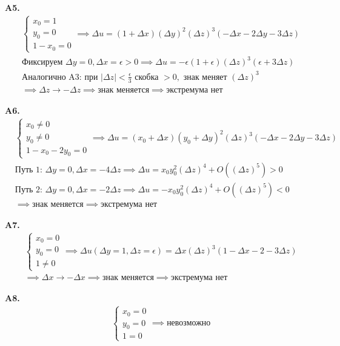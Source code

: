 \documentclass[12pt]{article}
\begin{document}
\noindent \textbf{A5.}
\begin{align*}
&\begin{cases} x_0 = 1 \\ y_0 = 0 \\ 1 - x_0 = 0 \end{cases} \implies \Delta u = (1+\Delta x)(\Delta y)^2(\Delta z)^3(-\Delta x - 2\Delta y - 3\Delta z) \\
&\text{Фиксируем } \Delta y = 0, \Delta x = \epsilon > 0 \implies \Delta u = -\epsilon(1+\epsilon)(\Delta z)^3(\epsilon + 3\Delta z) \\
&\text{Аналогично A3: при } |\Delta z| < \frac{\epsilon}{3} \text{ скобка } > 0, \text{ знак меняет } (\Delta z)^3 \\
&\implies \Delta z \to -\Delta z \implies \text{знак меняется} \implies \text{экстремума нет}
\end{align*}

\noindent \textbf{A6.}
\begin{align*}
&\begin{cases} x_0 \neq 0 \\ y_0 \neq 0 \\ 1 - x_0 - 2y_0 = 0 \end{cases} \implies \Delta u = (x_0+\Delta x)(y_0+\Delta y)^2(\Delta z)^3(-\Delta x - 2\Delta y - 3\Delta z) \\
&\text{Путь 1: } \Delta y = 0, \Delta x = -4\Delta z \implies \Delta u = x_0 y_0^2 (\Delta z)^4 + O((\Delta z)^5) > 0 \\
&\text{Путь 2: } \Delta y = 0, \Delta x = -2\Delta z \implies \Delta u = -x_0 y_0^2 (\Delta z)^4 + O((\Delta z)^5) < 0 \\
&\implies \text{знак меняется} \implies \text{экстремума нет}
\end{align*}

\noindent \textbf{A7.}
\begin{align*}
&\begin{cases} x_0 = 0 \\ y_0 = 0 \\ 1 \neq 0 \end{cases} \implies \Delta u(\Delta y=1, \Delta z=\epsilon) = \Delta x(\Delta z)^3(1-\Delta x-2-3\Delta z) \\
&\implies \Delta x \to -\Delta x \implies \text{знак меняется} \implies \text{экстремума нет}
\end{align*}

\noindent \textbf{A8.}
\begin{align*}
&\begin{cases} x_0 = 0 \\ y_0 = 0 \\ 1 = 0 \end{cases} \implies \text{невозможно}
\end{align*}
\end{document}
